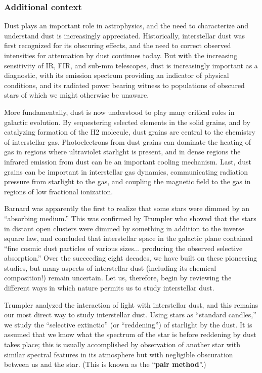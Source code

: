 \documentclass[a4paper,10pt]{article}
\begin{document}
\subsubsection{Additional context}

Dust plays an important role in astrophysics, and the need to characterize and understand dust is increasingly appreciated. Historically, interstellar dust was first recognized for its obscuring effects, and the need to correct observed intensities for attenuation by dust continues today. But with the increasing sensitivity of IR, FIR, and sub-mm telescopes, dust is increasingly important as a diagnostic, with its emission spectrum providing an indicator of physical conditions, and its radiated power bearing witness to populations of obscured stars of which we might otherwise be unaware.

{\noindent}More fundamentally, dust is now understood to play many critical roles in galactic evolution. By sequestering selected elements in the solid grains, and by catalyzing formation of the H2 molecule, dust grains are central to the chemistry of interstellar gas. Photoelectrons from dust grains can dominate the heating of gas in regions where ultraviolet starlight is present, and in dense regions the infrared emission from dust can be an important cooling mechanism. Last, dust grains can be important in interstellar gas dynamics, communicating radiation pressure from starlight to the gas, and coupling the magnetic field to the gas in regions of low fractional ionization.

{\noindent}Barnard was apparently the first to realize that some stars were dimmed by an “absorbing medium.” This was confirmed by Trumpler who showed that the stars in distant open clusters were dimmed by something in addition to the inverse square law, and concluded that interstellar space in the galactic plane contained ``fine cosmic dust particles of various sizes... producing the observed selective absorption.'' Over the succeeding eight decades, we have built on these pioneering studies, but many aspects of interstellar dust (including its chemical composition!) remain uncertain. Let us, therefore, begin by reviewing the different ways in which nature permits us to study interstellar dust.

{\noindent}Trumpler analyzed the interaction of light with interstellar dust, and this remains our most direct way to study interstellar dust. Using stars as ``standard candles,'' we study the ``selective extinctio'' (or “reddening'') of starlight by the dust. It is assumed that we know what the spectrum of the star is before reddening by dust takes place; this is usually accomplished by observation of another star with similar spectral features in its atmosphere but with negligible obscuration between us and the star. (This is known as the ``\textbf{pair method}''.)
\end{document}
